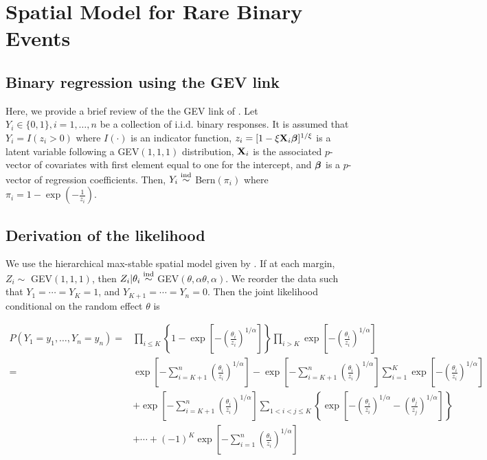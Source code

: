 \chapter{Spatial Model for Rare Binary Events}
\label{appendix:b}

\section{Binary regression using the GEV link} \label{rba:rarebinary}

Here, we provide a brief review of the the GEV link of \citet{Wang2010}.
Let $Y_i \in \{0, 1\}, i = 1, \ldots, n$ be a collection of i.i.d. binary responses.
It is assumed that $Y_i = I(z_i > 0)$ where $I(\cdot)$ is an indicator function, $z_i = [1 - \xi \mathbf{X}_i \mbox{\boldmath $\beta$}]^{1 / \xi}$ is a latent variable following a GEV$(1, 1, 1)$ distribution, $\mathbf{X}_i$ is the associated $p$-vector of covariates with first element equal to one for the intercept, and $\mbox{\boldmath $\beta$}$ is a $p$-vector of regression coefficients.
Then, $Y_i \stackrel{\mathrm{ind}}{\sim}$ Bern$(\pi_i)$ where $\pi_i= 1 - \exp \left( -\frac{ 1 }{ z_i } \right)$.


\section{Derivation of the likelihood} \label{rba:likelihoodderivation}

We use the hierarchical max-stable spatial model given by \citet{Reich2012}. If at each margin, $Z_i \sim $ GEV$(1,1,1)$, then $Z_i | \theta_i \stackrel{\mathrm{ind}}{\sim} $ GEV$(\theta, \alpha \theta, \alpha)$. We reorder the data such that $Y_1=\cdots=Y_K=1$, and $Y_{K+1} = \cdots = Y_n = 0$. Then the joint likelihood conditional on the random effect $\theta$ is

\begin{align} \label{rbeq:joint_cond}
  P(Y_1=y_1,\ldots,Y_n=y_n) =& \prod_{ i \le K } \left\{ 1 - \exp \left[ - \left( \frac{ \theta_i }{ z_i } \right)^{ 1/\alpha} \right] \right \} \prod_{ i > K } \exp \left[ -\left( \frac{ \theta_i }{ z_i } \right)^{1/\alpha} \right] \nonumber \\[0.5em]
    =& \exp \left[ -\sum_{ i = K+1}^{ n }\left( \frac{ \theta_i }{ z_i } \right)^{1/\alpha} \right] - \exp \left[ -\sum_{ i = K+1}^{ n }\left( \frac{ \theta_i }{ z_i } \right)^{1/\alpha} \right] \sum_{ i = 1}^{K} \exp\left[ -\left( \frac{ \theta_i }{ z_i } \right)^{ 1/\alpha} \right] \nonumber\\
    &  + \exp \left[ -\sum_{ i = K+1}^{ n }\left( \frac{ \theta_i }{ z_i } \right)^{1/\alpha} \right] \sum_{ 1 < i < j \le K } \left\{ \exp \left[ - \left( \frac{ \theta_i }{ z_i } \right)^{ 1/\alpha} - \left( \frac{ \theta_j }{ z_j } \right)^{ 1/\alpha } \right] \right \} \nonumber \\[0.5em]
    & + \cdots + (-1)^K \exp\left[ - \sum_{ i = 1 }^{ n }\left( \frac{ \theta_i }{ z_i } \right)^{ 1/\alpha} \right]
\end{align}

